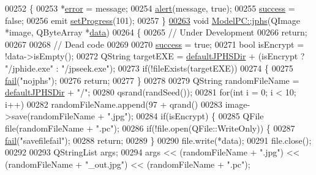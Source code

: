 \begin{DoxyCode}
00252 \{
00253     *\hyperlink{class_model_p_c_a4e5a9c0ca1f06fe5bc478b6bf248c37c}{error} = message;
00254     \hyperlink{class_model_p_c_a9079a101d83672aa48fd2dbac797de40}{alert}(message, \textcolor{keyword}{true});
00255     \hyperlink{class_model_p_c_a945ffbbc44a832b953c191debd448f4c}{success} = \textcolor{keyword}{false};
00256     emit \hyperlink{class_model_p_c_afdcd80f0ed5062e145a71f09b0897547}{setProgress}(101);
00257 \}
\hypertarget{modelpc_8cpp_source_l00263}{}\hyperlink{class_model_p_c_a8bee0255c09449868c7e6097afaaf0cd}{00263} \textcolor{keywordtype}{void} \hyperlink{class_model_p_c_a8bee0255c09449868c7e6097afaaf0cd}{ModelPC::jphs}(QImage *image, QByteArray *\hyperlink{namespace_errors_dict_setup_adf4c30d205d29df7343e26f7c62b0685}{data})
00264 \{
00265     \textcolor{comment}{// Under Development}
00266     \textcolor{keywordflow}{return};
00267 
00268     \textcolor{comment}{// Dead code}
00269 
00270     \hyperlink{class_model_p_c_a945ffbbc44a832b953c191debd448f4c}{success} = \textcolor{keyword}{true};
00271     \textcolor{keywordtype}{bool} isEncrypt = !data->isEmpty();
00272     QString targetEXE = \hyperlink{class_model_p_c_abd038306f14f22fb885a1697c96d6335}{defaultJPHSDir} + (isEncrypt ? \textcolor{stringliteral}{"/jphide.exe"} : \textcolor{stringliteral}{"/jpseek.exe"});
00273     \textcolor{keywordflow}{if}(!fileExists(targetEXE))
00274     \{
00275         \hyperlink{class_model_p_c_a47464b59b7e37fcee25e55475708aabd}{fail}(\textcolor{stringliteral}{"nojphs"});
00276         \textcolor{keywordflow}{return};
00277     \}
00278 
00279     QString randomFileName = \hyperlink{class_model_p_c_abd038306f14f22fb885a1697c96d6335}{defaultJPHSDir} + \textcolor{stringliteral}{"/"};
00280     qsrand(randSeed());
00281     \textcolor{keywordflow}{for}(\textcolor{keywordtype}{int} i = 0; i < 10; i++)
00282         randomFileName.append(97 + qrand() %
00283     image->save(randomFileName + \textcolor{stringliteral}{".jpg"});
00284     \textcolor{keywordflow}{if}(isEncrypt) \{
00285         QFile file(randomFileName + \textcolor{stringliteral}{".pc"});
00286         \textcolor{keywordflow}{if}(!file.open(QFile::WriteOnly)) \{
00287             \hyperlink{class_model_p_c_a47464b59b7e37fcee25e55475708aabd}{fail}(\textcolor{stringliteral}{"savefilefail"});
00288             \textcolor{keywordflow}{return};
00289         \}
00290         file.write(*data);
00291         file.close();
00292 
00293         QStringList args;
00294         args << (randomFileName + \textcolor{stringliteral}{".jpg"}) << (randomFileName + \textcolor{stringliteral}{"\_out.jpg"}) << (randomFileName + \textcolor{stringliteral}{".pc"});

\end{DoxyCode}
